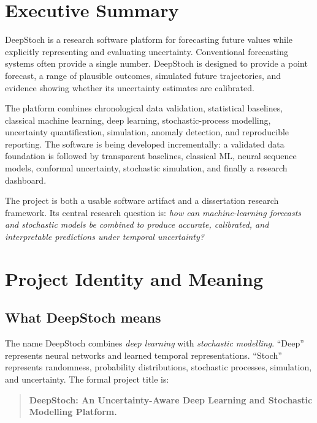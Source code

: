 \documentclass[11pt,a4paper]{report}
\begin{document}
\chapter*{Executive Summary}
DeepStoch is a research software platform for forecasting future values while explicitly representing and evaluating uncertainty. Conventional forecasting systems often provide a single number. DeepStoch is designed to provide a point forecast, a range of plausible outcomes, simulated future trajectories, and evidence showing whether its uncertainty estimates are calibrated.

The platform combines chronological data validation, statistical baselines, classical machine learning, deep learning, stochastic-process modelling, uncertainty quantification, simulation, anomaly detection, and reproducible reporting. The software is being developed incrementally: a validated data foundation is followed by transparent baselines, classical ML, neural sequence models, conformal uncertainty, stochastic simulation, and finally a research dashboard.

The project is both a usable software artifact and a dissertation research framework. Its central research question is: \emph{how can machine-learning forecasts and stochastic models be combined to produce accurate, calibrated, and interpretable predictions under temporal uncertainty?}

\tableofcontents
\listoftables
\listoffigures
\clearpage
{}

\chapter{Project Identity and Meaning}
\section{What DeepStoch means}
The name DeepStoch combines \emph{deep learning} with \emph{stochastic modelling}. ``Deep'' represents neural networks and learned temporal representations. ``Stoch'' represents randomness, probability distributions, stochastic processes, simulation, and uncertainty. The formal project title is:

\begin{quote}
\textbf{DeepStoch: An Uncertainty-Aware Deep Learning and Stochastic Modelling Platform.}
\end{quote}
\end{document}

